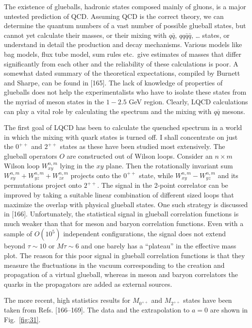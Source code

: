 The existence of glueballs, hadronic states composed mainly of gluons, is a major untested prediction of QCD. Assuming QCD is the correct theory, we can determine the quantum numbers of a vast number of possible glueball states, but cannot yet calculate their masses, or their mixing with $q\bar{q}$, $qq\bar{q}\bar{q}$, \ldots{} states, or understand in detail the production and decay mechanisms. Various models like bag models, flux tube model, sum rules etc.\ give estimates of masses that differ significantly from each other and the reliability of these calculations is poor. A somewhat dated summary of the theoretical expectations, compiled by Burnett and Sharpe, can be found in [165]. The lack of knowledge of properties of glueballs does not help the experimentalists who have to isolate these states from the myriad of meson states in the $1-2.5$ GeV region. Clearly, LQCD calculations can play a vital role by calculating the spectrum and the mixing with $q\bar{q}$ mesons.

The first goal of LQCD has been to calculate the quenched spectrum in a world in which the mixing with quark states is turned off. I shall concentrate on just the $0^{++}$ and $2^{++}$ states as these have been studied most extensively. The glueball operators $O$ are constructed out of Wilson loops. Consider an $n \times m$ Wilson loop $W^{n,m}_{xy}$ lying in the $xy$ plane. Then the rotationally invariant sum $W^{n,m}_{xy} + W^{n,m}_{yz} + W^{n,m}_{zx}$ projects onto the $0^{++}$ state, while $W^{n,m}_{xy} - W^{n,m}_{yz}$ and its permutations project onto $2^{++}$. The signal in the 2-point correlator can be improved by taking a suitable linear combination of different sized loops that maximize the overlap with physical glueball states. One such strategy is discussed in [166]. Unfortunately, the statistical signal in glueball correlation functions is much weaker than that for meson and baryon correlation functions. Even with a sample of $O(10^5)$ independent configurations, the signal does not extend beyond $\tau \sim 10$ or $M\tau \sim 6$ and one barely has a ``plateau'' in the effective mass plot. The reason for this poor signal in glueball correlation functions is that they measure the fluctuations in the vacuum corresponding to the creation and propagation of a virtual glueball, whereas in meson and baryon correlators the quarks in the propagators are added as external sources.

The more recent, high statistics results for $M_{0^{++}}$ and $M_{2^{++}}$ states have been taken from Refs. [166--169]. The data and the extrapolation to $a = 0$ are shown in Fig.~\ref{fig:31}.

